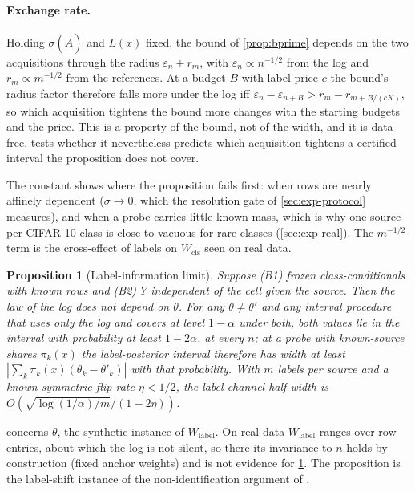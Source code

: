 \documentclass[twoside]{article}
\newcommand{\Wcls}{\ensuremath{W_{\mathrm{cls}}}}
\newcommand{\Wlab}{\ensuremath{W_{\mathrm{label}}}}
\newtheorem{proposition}{Proposition}
\begin{document}
\paragraph{Exchange rate.} Holding $\sigma(\hat A)$ and $L(x)$ fixed, the bound of \cref{prop:bprime}
depends on the two acquisitions through the radius $\varepsilon_n+r_m$, with $\varepsilon_n\propto
n^{-1/2}$ from the log and $r_m\propto m^{-1/2}$ from the references. At a budget $B$ with label price $c$
the bound's radius factor therefore falls more under the log iff
$\varepsilon_{n}-\varepsilon_{n+B}>r_m-r_{m+B/(cK)}$, so which acquisition tightens the bound more changes
with the starting budgets and the price. This is a property of the bound, not of the width, and it is
data-free.  tests whether it nevertheless predicts which acquisition tightens a
certified interval the proposition does not cover.

The constant shows where the proposition fails first: when rows are nearly affinely dependent
($\sigma\to0$, which the resolution gate of \cref{sec:exp-protocol} measures), and when a probe
carries little known mass, which is why one source per CIFAR-10 class is close to vacuous for rare
classes (\cref{sec:exp-real}). The $m^{-1/2}$ term is the cross-effect of labels on $\Wcls$ seen on
real data.

\begin{proposition}[Label-information limit]
\label{prop:b}
Suppose (B1) frozen class-conditionals with known rows and (B2) $Y$ independent of the cell given the
source. Then the law of the log does not depend on $\theta$. For any $\theta\neq\theta'$ and any
interval procedure that uses only the log and covers at level $1-\alpha$ under both, both values lie
in the interval with probability at least $1-2\alpha$, at every $n$; at a probe with known-source
shares $\pi_k(x)$ the label-posterior interval therefore has width at least
$|\sum_k\pi_k(x)(\theta_k-\theta'_k)|$ with that probability. With $m$ labels per source and a known
symmetric flip rate $\eta<1/2$, the label-channel half-width is $O(\sqrt{\log(1/\alpha)/m}/(1-2\eta))$.
\end{proposition}

 concerns $\theta$, the synthetic instance of $\Wlab$. On real data $\Wlab$ ranges over
row entries, about which the log is not silent, so there its invariance to $n$ holds by
construction (fixed anchor weights) and is not evidence for \cref{prop:b}. The proposition is the
label-shift instance of the non-identification argument of \citet{young2026epistemic}.
\end{document}
